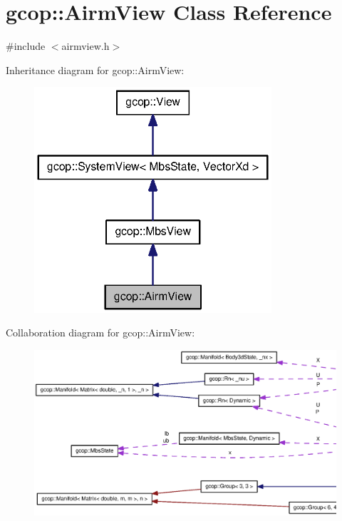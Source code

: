 \section{gcop\-:\-:\-Airm\-View \-Class \-Reference}
\label{classgcop_1_1AirmView}


{\ttfamily \#include $<$airmview.\-h$>$}



\-Inheritance diagram for gcop\-:\-:\-Airm\-View\-:
\nopagebreak
\begin{figure}[H]
\begin{center}
\leavevmode
\includegraphics[width=250pt]{classgcop_1_1AirmView__inherit__graph}
\end{center}
\end{figure}


\-Collaboration diagram for gcop\-:\-:\-Airm\-View\-:
\nopagebreak
\begin{figure}[H]
\begin{center}
\leavevmode
\includegraphics[width=350pt]{classgcop_1_1AirmView__coll__graph}
\end{center}
\end{figure}
